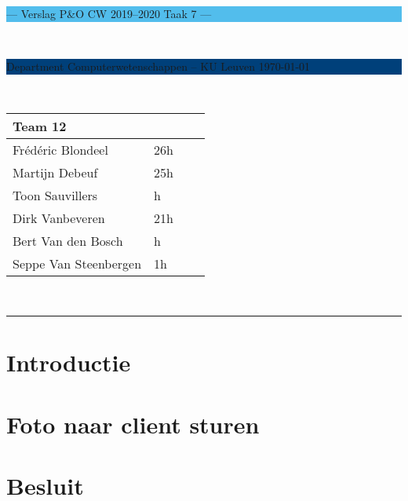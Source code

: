 \documentclass[a4paper,11pt]{article}
\begin{document}
\noindent
\colorbox[HTML]{52BDEC}{\bfseries\parbox{\textwidth}{\centering\large
  --- Verslag P\&O CW 2019--2020 Taak 7 ---
}}
\\[-1mm]
\colorbox[HTML]{00407A}{\bfseries\color{white}\parbox{\textwidth}{
  Department Computerwetenschappen -- KU Leuven
  \hfill
  \today
}}
\\

\smallskip

\noindent

\begin{tabular}{*4l}
\toprule
\multicolumn{2}{l}{\large\textbf{Team 12}} \\
\midrule
Frédéric Blondeel & 26h \\
Martijn Debeuf & 25h \\
Toon Sauvillers & h \\ %
Dirk Vanbeveren & 21h \\
Bert Van den Bosch & h \\ 
Seppe Van Steenbergen & 1h \\


\bottomrule
\hline
\end{tabular}\\

\noindent
{\color[HTML]{52BDEC} \rule{\linewidth}{1mm} }
\tableofcontents
\newpage
\section{Introductie}\label{sec:introductie}



\section{Foto naar client sturen}



\section{Besluit}\label{sec:besluit}


\newpage



\end{document}
